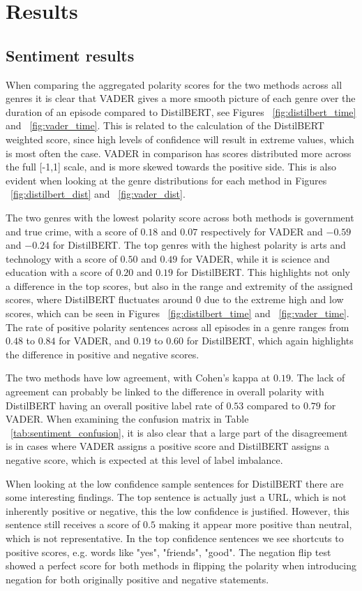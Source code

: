 \documentclass{article}
\begin{document}
\section{Results}
\subsection{Sentiment results}
When comparing the aggregated polarity scores for the two methods across all genres it is clear that VADER gives a more smooth picture of each genre over the duration of an episode compared to DistilBERT, see Figures ~\ref{fig:distilbert_time} and ~\ref{fig:vader_time}. This is related to the calculation of the DistilBERT weighted score, since high levels of confidence will result in extreme values, which is most often the case. VADER in comparison has scores distributed more across the full [-1,1] scale, and is more skewed towards the positive side. This is also evident when looking at the genre distributions for each method in Figures ~\ref{fig:distilbert_dist} and ~\ref{fig:vader_dist}.

The two genres with the lowest polarity score across both methods is government and true crime, with a score of $0.18$ and $0.07$ respectively for VADER and $-0.59$ and $-0.24$ for DistilBERT. The top genres with the highest polarity is arts and technology with a score of $0.50$ and $0.49$ for VADER, while it is science and education with a score of $0.20$ and $0.19$ for DistilBERT. This highlights not only a difference in the top scores, but also in the range and extremity of the assigned scores, where DistilBERT fluctuates around 0 due to the extreme high and low scores, which can be seen in Figures ~\ref{fig:distilbert_time} and ~\ref{fig:vader_time}. The rate of positive polarity sentences across all episodes in a genre ranges from $0.48$ to $0.84$ for VADER, and $0.19$ to $0.60$ for DistilBERT, which again highlights the difference in positive and negative scores. 

The two methods have low agreement, with Cohen's kappa at $0.19$. The lack of agreement can probably be linked to the difference in overall polarity with DistilBERT having an overall positive label rate of $0.53$ compared to $0.79$ for VADER. When examining the confusion matrix in Table ~\ref{tab:sentiment_confusion}, it is also clear that a large part of the disagreement is in cases where VADER assigns a positive score and DistilBERT assigns a negative score, which is expected at this level of label imbalance. 

When looking at the low confidence sample sentences for DistilBERT there are some interesting findings. The top sentence is actually just a URL, which is not inherently positive or negative, this the low confidence is justified. However, this sentence still receives a score of $0.5$ making it appear more positive than neutral, which is not representative. In the top confidence sentences we see shortcuts to positive scores, e.g. words like "yes", "friends", "good". The negation flip test showed a perfect score for both methods in flipping the polarity when introducing negation for both originally positive and negative statements. 
\end{document}
